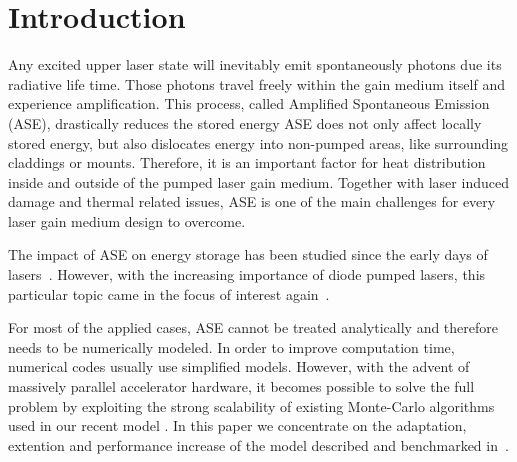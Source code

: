 \section{Introduction}
Any excited upper laser state will inevitably emit spontaneously
photons due its radiative life time. Those photons travel freely
within the gain medium itself and experience amplification.  This
process, called Amplified Spontaneous Emission (ASE), drastically
reduces the stored energy ASE does not only affect locally stored
energy, but also dislocates energy into non-pumped areas, like
surrounding claddings or mounts. Therefore, it is an important factor
for heat distribution inside and outside of the pumped laser gain
medium. Together with laser induced damage and thermal related issues,
ASE is one of the main challenges for every laser gain medium design
to overcome.

The impact of ASE on energy storage has been studied since the early
days of lasers~\cite{Intro1,Intro2,Intro3}. However, with the
increasing importance of diode pumped lasers, this particular topic
came in the focus of interest again~\cite{Intro4}.

For most of the applied cases, ASE cannot be treated analytically and
therefore needs to be numerically modeled. In order to improve
computation time, numerical codes usually use simplified
models. However, with the advent of massively parallel accelerator
hardware, it becomes possible to solve the full problem by exploiting
the strong scalability of existing Monte-Carlo algorithms used in our
recent model \cite{Intro4}. In this paper we concentrate on the
adaptation, extention and performance increase of the model described
and benchmarked in~\cite{Intro4}.
